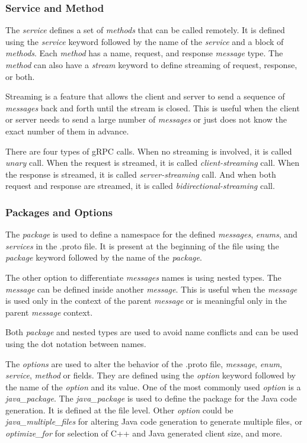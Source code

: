 \subsubsection{Service and Method}
The \textit{service} defines a set of \textit{methods} that can be called remotely.
It is defined using the \textit{service} keyword followed by the name of the \textit{service} and a block of \textit{methods}.
Each \textit{method} has a name, request, and response \textit{message} type.
The \textit{method} can also have a \textit{stream} keyword to define streaming of request, response, or both.
\cite{protobuf-proto3}

Streaming is a feature that allows the client and server to send a sequence of \textit{messages} back and forth until the stream is closed.
This is useful when the client or server needs to send a large number of \textit{messages} or just does not know the exact number of them in advance.
\cite{protobuf-proto3}

There are four types of gRPC calls.
When no streaming is involved, it is called \textit{unary} call.
When the request is streamed, it is called \textit{client-streaming} call.
When the response is streamed, it is called \textit{server-streaming} call.
And when both request and response are streamed, it is called \textit{bidirectional-streaming} call.
\cite{grpc-core-concept}

\subsubsection{Packages and Options}
The \textit{package} is used to define a namespace for the defined \textit{messages}, \textit{enums}, and \textit{services} in the .proto file.
It is present at the beginning of the file using the \textit{package} keyword followed by the name of the \textit{package}.
\cite{protobuf-proto3}

The other option to differentiate \textit{messages} names is using nested types.
The \textit{message} can be defined inside another \textit{message}.
This is useful when the \textit{message} is used only in the context of the parent \textit{message} or is meaningful only in the parent \textit{message} context.
\cite{protobuf-proto3}

Both \textit{package} and nested types are used to avoid name conflicts and can be used using the dot notation between names.

The \textit{options} are used to alter the behavior of the .proto file, \textit{message}, \textit{enum}, \textit{service}, \textit{method} or fields.
They are defined using the \textit{option} keyword followed by the name of the \textit{option} and its value.
One of the most commonly used \textit{option} is a \textit{java\_package}.
The \textit{java\_package} is used to define the package for the Java code generation.
It is defined at the file level.
Other \textit{option} could be \textit{java\_multiple\_files} for altering Java code generation to generate multiple files, or \textit{optimize\_for} for selection of C++ and Java generated client size, and more.
\cite{protobuf-proto3}

